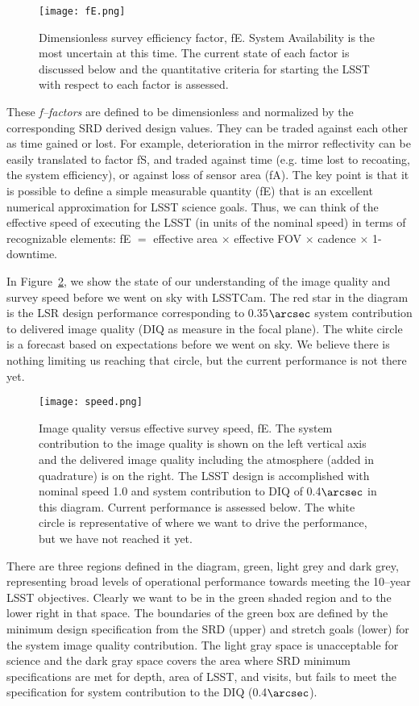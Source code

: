\begin{figure}%
\centering
\texttt{[image: fE.png]}
\caption{Dimensionless survey efficiency factor, fE. System Availability is the most uncertain at this time. The current state of each factor is discussed below and the quantitative criteria for starting the LSST with respect to each factor is assessed.}
\label{fE}
\end{figure}

These {\it f--factors} are defined to be dimensionless and normalized by the corresponding SRD derived design values. They can be traded against each other as time gained or lost.  For example, deterioration in the mirror reflectivity can be easily translated to factor fS, and traded against time (e.g. time lost to recoating, the system efficiency), or against loss of sensor area (fA).
The key point is that it is possible to define a simple measurable quantity (fE) that is an excellent numerical approximation for LSST science goals. Thus, we can think of the effective speed of executing the LSST (in units of the nominal speed) in terms of recognizable elements:  fE $=$ effective area $\times$ effective FOV $\times$ cadence $\times$ 1-downtime.

In Figure~\ref{speed}, we show the state of our understanding of the image quality and survey speed before we went on sky with LSSTCam. The red star in the diagram is the LSR design performance corresponding to 0.35$\arcsec$ system contribution to delivered image quality (DIQ as measure in the focal plane). The white circle is a forecast based on expectations before we went on sky. We believe there is nothing limiting us reaching that circle, but the current performance is not there yet. 

\begin{figure}[t]
\centering
\texttt{[image: speed.png]}
\caption{Image quality versus effective survey speed, fE. The system contribution to the image quality is shown on the left vertical axis and the delivered image quality including the atmosphere (added in quadrature) is on the right. The LSST design is accomplished with nominal speed 1.0 and system contribution to DIQ of 0.4$\arcsec$ in this diagram. Current performance is assessed below. The white circle is representative of where we want to drive the performance, but we have not reached it yet.}
\label{speed}
\end{figure}

There are three regions defined in the diagram, green, light grey and dark grey, representing broad levels of operational performance towards meeting the 10--year LSST objectives. Clearly we want to be in the green shaded region and to the lower right in that space. The boundaries of the green box are defined by the minimum design specification from the SRD (upper) and stretch goals (lower) for the system image quality contribution.  The light gray space is unacceptable for science and the dark gray space covers the area where SRD minimum specifications are met for depth, area of LSST, and visits, but fails to meet the specification for system contribution to the DIQ (0.4$\arcsec$). 

